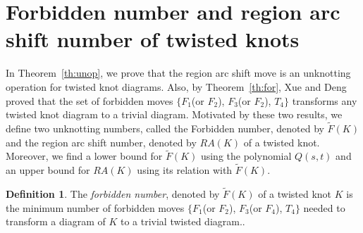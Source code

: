 \documentclass[10pt,a4paper,reqno]{amsart}
\theoremstyle{definition}
\newtheorem{definition}{Definition}[section]
\theoremstyle{remark}
\begin{document}
	\section{Forbidden number and region arc shift number of twisted knots}\label{sec:rasno}
	In Theorem~\ref{th:unop}, we prove that the region arc shift move is an unknotting operation for twisted knot diagrams. Also, by Theorem~\ref{th:for}, Xue and Deng proved that the set of forbidden moves $\{F_1$(or $F_2$), $F_3$(or $F_2$), $T_4\}$ transforms any twisted knot diagram to a trivial diagram. Motivated by these two results, we define two unknotting numbers, called the Forbidden number, denoted by $\tilde{F}(K)$ and the region arc shift number, denoted by $RA(K)$ of a twisted knot. Moreover, we find a lower bound for $\tilde{F}(K)$ using the polynomial $Q(s,t)$ and an upper bound for $RA(K)$ using its relation with $\tilde{F}(K)$.
	\begin{definition}
		The {\it forbidden number}, denoted by $ \tilde{F}(K)$ of  a twisted knot $K$ is the minimum number of forbidden moves $\{F_1$(or $F_2$), $F_3$(or $F_4$), $T_4\}
		$ needed to transform a diagram of $K$ to a trivial twisted diagram..
	\end{definition}
\end{document}
